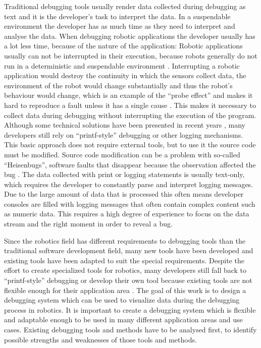 Traditional debugging tools usually render data collected during debugging as text and it is the developer's task to interpret the data. In a suspendable environment the developer has as much time as they need to interpret and analyse the data. When debugging robotic applications the developer usually has a lot less time, because of the nature of the application: Robotic applications usually can not be interrupted in their execution, because robots generally do not run in a deterministic and suspendable environment \cite{Gumbley2009}. Interrupting a robotic application would destroy the continuity in which the sensors collect data, the environment of the robot would change substantially and thus the robot's behaviour would change, which is an example of the ``probe effect'' and makes it hard to reproduce a fault unless it has a single cause \cite{Gumbley2009}. This makes it necessary to collect data during debugging without interrupting the execution of the program. Although some technical solutions have been presented in recent years \cite{Gumbley2009}, many developers still rely on ``printf-style'' debugging or other logging mechanisms. This basic approach does not require external tools, but to use it the source code must be modified. Source code modification can be a problem with so-called ``Heisenbugs'', software faults that disappear because the observation affected the bug \cite{Grottke2005}. The data collected with print or logging statements is usually text-only, which requires the developer to constantly parse and interpret logging messages. Due to the large amount of data that is processed this often means developer consoles are filled with logging messages that often contain complex content such as numeric data. This requires a high degree of experience to focus on the data stream and the right moment in order to reveal a bug.


Since the robotics field has different requirements to debugging tools than the traditional software development field, many new tools have been developed and existing tools have been adapted to suit the special requirements. Despite the effort to create specialized tools for robotics, many developers still fall back to ``printf-style'' debugging or develop their own tool because existing tools are not flexible enough for their application area \cite{Collett2010}. The goal of this work is to design a debugging system which can be used to visualize data during the debugging process in robotics. It is important to create a debugging system which is flexible and adaptable enough to be used in many different application areas and use cases. Existing debugging tools and methods have to be analysed first, to identify possible strengths and weaknesses of those tools and methods.

